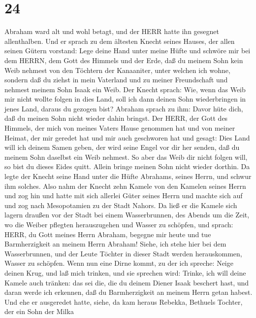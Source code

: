 \hypertarget{section-23}{%
\section{24}\label{section-23}}

 Abraham ward alt und wohl betagt, und der HERR hatte ihn
gesegnet allenthalben.  Und er sprach zu dem ältesten Knecht
seines Hauses, der allen seinen Gütern vorstand: Lege deine Hand unter
meine Hüfte  und schwöre mir bei dem HERRN, dem Gott des
Himmels und der Erde, daß du meinem Sohn kein Weib nehmest von den
Töchtern der Kanaaniter, unter welchen ich wohne,  sondern
daß du ziehst in mein Vaterland und zu meiner Freundschaft und nehmest
meinem Sohn Isaak ein Weib.  Der Knecht sprach: Wie, wenn
das Weib mir nicht wollte folgen in dies Land, soll ich dann deinen Sohn
wiederbringen in jenes Land, daraus du gezogen bist? 
Abraham sprach zu ihm: Davor hüte dich, daß du meinen Sohn nicht wieder
dahin bringst.  Der HERR, der Gott des Himmels, der mich von
meines Vaters Hause genommen hat und von meiner Heimat, der mir geredet
hat und mir auch geschworen hat und gesagt: Dies Land will ich deinem
Samen geben, der wird seine Engel vor dir her senden, daß du meinem Sohn
daselbst ein Weib nehmest.  So aber das Weib dir nicht
folgen will, so bist du dieses Eides quitt. Allein bringe meinen Sohn
nicht wieder dorthin.  Da legte der Knecht seine Hand unter
die Hüfte Abrahams, seines Herrn, und schwur ihm solches. 
Also nahm der Knecht zehn Kamele von den Kamelen seines Herrn und zog
hin und hatte mit sich allerlei Güter seines Herrn und machte sich auf
und zog nach Mesopotamien zu der Stadt Nahors.  Da ließ er
die Kamele sich lagern draußen vor der Stadt bei einem Wasserbrunnen,
des Abends um die Zeit, wo die Weiber pflegten herauszugehen und Wasser
zu schöpfen,  und sprach: HERR, du Gott meines Herrn
Abraham, begegne mir heute und tue Barmherzigkeit an meinem Herrn
Abraham!  Siehe, ich stehe hier bei dem Wasserbrunnen, und
der Leute Töchter in dieser Stadt werden herauskommen, Wasser zu
schöpfen.  Wenn nun eine Dirne kommt, zu der ich spreche:
Neige deinen Krug, und laß mich trinken, und sie sprechen wird: Trinke,
ich will deine Kamele auch tränken: das sei die, die du deinem Diener
Isaak beschert hast, und daran werde ich erkennen, daß du Barmherzigkeit
an meinem Herrn getan habest.  Und ehe er ausgeredet hatte,
siehe, da kam heraus Rebekka, Bethuels Tochter, der ein Sohn der Milka
